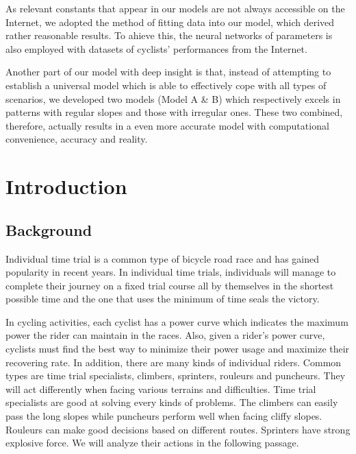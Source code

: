 \documentclass{article}
\begin{document}
	As relevant constants that appear in our models are not always accessible on the Internet, we adopted the method of fitting data into our model, which derived rather reasonable results. To ahieve this, the neural networks of parameters is also employed with datasets of cyclists' performances from the Internet.

	Another part of our model with deep insight is that, instead of attempting to establish a universal model which is able to effectively cope with all types of scenarios, we developed two models (Model A \& B) which respectively excels in patterns with regular slopes and those with irregular ones. These two combined, therefore, actually results in a even more accurate model with computational convenience, accuracy and reality.




    \clearpage
    \newpage
    \pagestyle{empty}
    \setlength{\headheight}{12pt}
    \renewcommand{\headrulewidth}{0.5pt}
    \renewcommand{\footrulewidth}{0.0pt}
    \pagestyle{fancy}
    \cfoot{}
    \lfoot{}
    \rfoot{}

    \clearpage
    \thispagestyle{empty}
    \tableofcontents
    \newpage
    \pagestyle{fancy}
    \setcounter{page}{1}

	\newpage
	\section{Introduction}
		\subsection{Background}
		Individual time trial is a common type of bicycle road race and has gained popularity in recent years. In individual time trials, individuals will manage to complete their journey on a fixed trial course all by themselves in the shortest possible time and the one that uses the minimum of time seals the victory.

		In cycling activities, each cyclist has a power curve which indicates the maximum power the rider can maintain in the races. Also, given a rider's power curve, cyclists must find the best way to minimize their power usage and maximize their recovering rate. In addition, there are many kinds of individual riders. Common types are time trial specialists, climbers, sprinters, rouleurs and puncheurs. They will act differently when facing various terrains and difficulties. Time trial specialists are good at solving every kinds of problems. The climbers can easily pass the long slopes while puncheurs perform well when facing cliffy slopes. Rouleurs can make good decisions based on different routes. Sprinters have strong explosive force. We will analyze their actions in the following passage.
\end{document}
